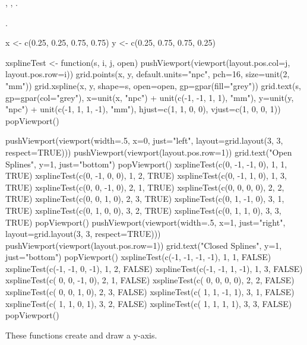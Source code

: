 %
\begin{SeeAlso}\relax
{},
,
.

.
\end{SeeAlso}
%
\begin{Examples}
\begin{ExampleCode}
x <- c(0.25, 0.25, 0.75, 0.75)
y <- c(0.25, 0.75, 0.75, 0.25)

xsplineTest <- function(s, i, j, open) {
  pushViewport(viewport(layout.pos.col=j, layout.pos.row=i))
  grid.points(x, y, default.units="npc", pch=16, size=unit(2, "mm"))
  grid.xspline(x, y, shape=s, open=open, gp=gpar(fill="grey"))
  grid.text(s, gp=gpar(col="grey"),
            x=unit(x, "npc") + unit(c(-1, -1, 1, 1), "mm"),
            y=unit(y, "npc") + unit(c(-1, 1, 1, -1), "mm"),
            hjust=c(1, 1, 0, 0),
            vjust=c(1, 0, 0, 1))
  popViewport()
}

pushViewport(viewport(width=.5, x=0, just="left",
                      layout=grid.layout(3, 3, respect=TRUE)))
pushViewport(viewport(layout.pos.row=1))
grid.text("Open Splines", y=1, just="bottom")
popViewport()
xsplineTest(c(0, -1, -1, 0), 1, 1, TRUE)
xsplineTest(c(0, -1,  0, 0), 1, 2, TRUE)
xsplineTest(c(0, -1,  1, 0), 1, 3, TRUE)
xsplineTest(c(0,  0, -1, 0), 2, 1, TRUE)
xsplineTest(c(0,  0,  0, 0), 2, 2, TRUE)
xsplineTest(c(0,  0,  1, 0), 2, 3, TRUE)
xsplineTest(c(0,  1, -1, 0), 3, 1, TRUE)
xsplineTest(c(0,  1,  0, 0), 3, 2, TRUE)
xsplineTest(c(0,  1,  1, 0), 3, 3, TRUE)
popViewport()
pushViewport(viewport(width=.5, x=1, just="right",
                      layout=grid.layout(3, 3, respect=TRUE)))
pushViewport(viewport(layout.pos.row=1))
grid.text("Closed Splines", y=1, just="bottom")
popViewport()
xsplineTest(c(-1, -1, -1, -1), 1, 1, FALSE)
xsplineTest(c(-1, -1,  0, -1), 1, 2, FALSE)
xsplineTest(c(-1, -1,  1, -1), 1, 3, FALSE)
xsplineTest(c( 0,  0, -1,  0), 2, 1, FALSE)
xsplineTest(c( 0,  0,  0,  0), 2, 2, FALSE)
xsplineTest(c( 0,  0,  1,  0), 2, 3, FALSE)
xsplineTest(c( 1,  1, -1,  1), 3, 1, FALSE)
xsplineTest(c( 1,  1,  0,  1), 3, 2, FALSE)
xsplineTest(c( 1,  1,  1,  1), 3, 3, FALSE)
popViewport()
\end{ExampleCode}
\end{Examples}
%
\begin{Description}\relax
These functions create and draw a y-axis.
\end{Description}
